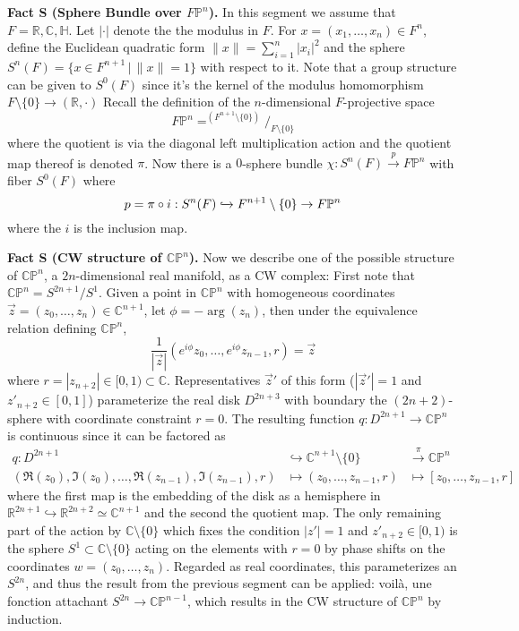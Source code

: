 \documentclass[10pt]{article}
\newcounter{counter}
\newcommand{\counter}{\refstepcounter{counter}{\thecounter} }
\begin{document}
\colorbox{red!30}{\textbf{Fact S\counter (Sphere Bundle over $F\mathbb{P}^n$).}} In this segment we assume that $F=\mathbb{R},\mathbb{C},\mathbb{H}$. Let $|\cdot|$ denote the the modulus in $F$. For $x=(x_1,\dots,x_n)\in F^n$, define the Euclidean quadratic form $\lVert x\rVert=\sum_{i=1}^n|x_i|^2$ and the sphere $S^n(F)=\{x\in F^{n+1}\,\big|\,\lVert x\rVert=1\}$ with respect to it. Note that a group structure can be given to $S^0(F)$ since it's the kernel of the modulus homomorphism $F\setminus\{0\}\to(\mathbb{R},\cdot)$ Recall the definition of the $n$-dimensional $F$-projective space $$F\mathbb{P}^n=^{(F^{n+1}\setminus\{0\})}\big/_{F\setminus\{0\}}$$ where the quotient is via the diagonal left multiplication action and the quotient map thereof is denoted $\pi$. Now there is a $0$-sphere bundle $\chi:S^n(F)\overset{p}{\to}F\mathbb{P}^n$ with fiber $S^0(F)$ where $$p=\pi\circ i:S^n(F)\xhookrightarrow{}F^{n+1}\setminus\{0\}\to F\mathbb{P}^n$$ where the $i$ is the inclusion map.

\colorbox{red!30}{\textbf{Fact S\counter (CW structure of $\mathbb{CP}^{n}$).}} Now we describe one of the possible structure of $\mathbb{CP}^{n}$, a $2n$-dimensional real manifold, as a CW complex: First note that $\mathbb{CP}^{n}=S^{2n+1}/S^1$. Given a point in $\mathbb{CP}^{n}$ with homogeneous coordinates $\vec{z}=(z_0,\dots,z_{n})\in\mathbb{C}^{n+1}$, let $\phi=-\arg(z_{n})$, then under the equivalence relation defining $\mathbb{CP}^{n}$, $$\frac{1}{|\vec{z}|}(e^{i\phi}z_0,\dots,e^{i\phi}z_{n-1},r)=\vec{z}$$ where $r=|z_{n+2}|\in[0,1)\subset\mathbb{C}$. Representatives $\vec{z}'$ of this form ($|\vec{z}'|=1$ and $z'_{n+2}\in[0,1]$) parameterize the real disk $D^{2n+3}$ with boundary the $(2n+2)$-sphere with coordinate constraint $r=0$. The resulting function $q:D^{2n+1}\to\mathbb{CP}^{n}$ is continuous since it can be factored as
\begin{align*}
q:D^{2n+1}&\hookrightarrow\mathbb{C}^{n+1}\setminus\{0\}&\overset{\pi}{\to}\mathbb{CP}^{n}\\
(\Re(z_0),\Im(z_0),\dots,\Re(z_{n-1}),\Im(z_{n-1}),r)&\mapsto(z_0,\dots,z_{n-1},r)&\mapsto[z_0,\dots,z_{n-1},r]&
\end{align*}
where the first map is the embedding of the disk as a hemisphere in $\mathbb{R}^{2n+1}\hookrightarrow\mathbb{R}^{2n+2}\simeq\mathbb{C}^{n+1}$ and the second the quotient map. The only remaining part of the action by $\mathbb{C}\setminus\{0\}$ which fixes the condition $|z'|=1$ and $z'_{n+2}\in[0,1)$ is the sphere $S^1\subset\mathbb{C}\setminus\{0\}$ acting on the elements with $r=0$ by phase shifts on the coordinates $w=(z_0,\dots,z_{n})$. Regarded as real coordinates, this parameterizes an $S^{2n}$, and thus the result from the previous segment can be applied: voil\`a, une fonction attachant $S^{2n}\to\mathbb{CP}^{n-1}$, which results in the CW structure of $\mathbb{CP}^{n}$ by induction.
\end{document}
